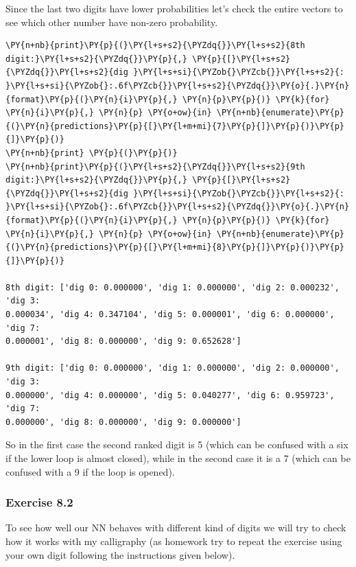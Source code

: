     Since the last two digits have lower probabilities let's check the entire
vectors to see which other number have non-zero probability.

    \begin{tcolorbox}[breakable, size=fbox, boxrule=1pt, pad at break*=1mm,colback=cellbackground, colframe=cellborder]
\begin{Verbatim}[commandchars=\\\{\}]
\PY{n+nb}{print}\PY{p}{(}\PY{l+s+s2}{\PYZdq{}}\PY{l+s+s2}{8th digit:}\PY{l+s+s2}{\PYZdq{}}\PY{p}{,} \PY{p}{[}\PY{l+s+s2}{\PYZdq{}}\PY{l+s+s2}{dig }\PY{l+s+si}{\PYZob{}\PYZcb{}}\PY{l+s+s2}{: }\PY{l+s+si}{\PYZob{}:.6f\PYZcb{}}\PY{l+s+s2}{\PYZdq{}}\PY{o}{.}\PY{n}{format}\PY{p}{(}\PY{n}{i}\PY{p}{,} \PY{n}{p}\PY{p}{)} \PY{k}{for} \PY{n}{i}\PY{p}{,} \PY{n}{p} \PY{o+ow}{in} \PY{n+nb}{enumerate}\PY{p}{(}\PY{n}{predictions}\PY{p}{[}\PY{l+m+mi}{7}\PY{p}{]}\PY{p}{)}\PY{p}{]}\PY{p}{)}
\PY{n+nb}{print} \PY{p}{(}\PY{p}{)}
\PY{n+nb}{print}\PY{p}{(}\PY{l+s+s2}{\PYZdq{}}\PY{l+s+s2}{9th digit:}\PY{l+s+s2}{\PYZdq{}}\PY{p}{,} \PY{p}{[}\PY{l+s+s2}{\PYZdq{}}\PY{l+s+s2}{dig }\PY{l+s+si}{\PYZob{}\PYZcb{}}\PY{l+s+s2}{: }\PY{l+s+si}{\PYZob{}:.6f\PYZcb{}}\PY{l+s+s2}{\PYZdq{}}\PY{o}{.}\PY{n}{format}\PY{p}{(}\PY{n}{i}\PY{p}{,} \PY{n}{p}\PY{p}{)} \PY{k}{for} \PY{n}{i}\PY{p}{,} \PY{n}{p} \PY{o+ow}{in} \PY{n+nb}{enumerate}\PY{p}{(}\PY{n}{predictions}\PY{p}{[}\PY{l+m+mi}{8}\PY{p}{]}\PY{p}{)}\PY{p}{]}\PY{p}{)}

8th digit: ['dig 0: 0.000000', 'dig 1: 0.000000', 'dig 2: 0.000232', 'dig 3:
0.000034', 'dig 4: 0.347104', 'dig 5: 0.000001', 'dig 6: 0.000000', 'dig 7:
0.000001', 'dig 8: 0.000000', 'dig 9: 0.652628']

9th digit: ['dig 0: 0.000000', 'dig 1: 0.000000', 'dig 2: 0.000000', 'dig 3:
0.000000', 'dig 4: 0.000000', 'dig 5: 0.040277', 'dig 6: 0.959723', 'dig 7:
0.000000', 'dig 8: 0.000000', 'dig 9: 0.000000']
    \end{Verbatim}
\end{tcolorbox}

    So in the first case the second ranked digit is 5 (which can be confused
with a six if the lower loop is almost closed), while in the second case
it is a 7 (which can be confused with a 9 if the loop is opened).

\subsubsection{Exercise 8.2}\label{exercise-8.2}

To see how well our NN behaves with different kind of digits we will try
to check how it works with my calligraphy (as homework try to repeat the
exercise using your own digit following the instructions given below).

